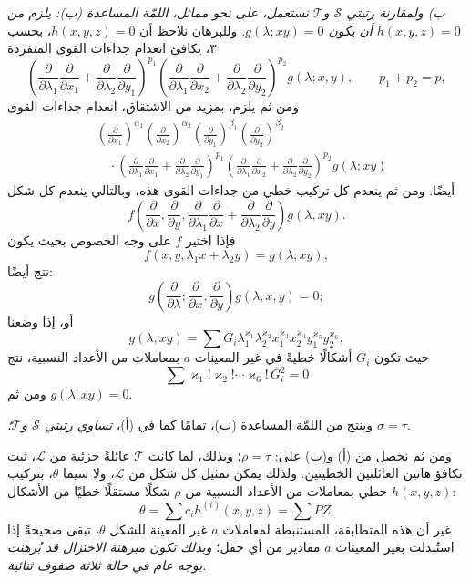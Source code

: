 \documentclass[11pt]{article}
\begin{document}
\emph{ب) ولمقارنة رتبتي $\mathcal S$ و$\mathcal T$ نستعمل، على نحو مماثل، اللمّة المساعدة (ب): يلزم من $h(x,y,z)=0$ أن يكون $g(\lambda;xy)=0$.} وللبرهان نلاحظ أن $h(x,y,z)=0$، بحسب ٣، يكافئ انعدام جداءات القوى المنفردة
\[
 \left(\frac{\partial}{\partial\lambda_1}\frac{\partial}{\partial x_1}
 +\frac{\partial}{\partial\lambda_2}\frac{\partial}{\partial y_1}\right)^{p_1}
 \left(\frac{\partial}{\partial\lambda_1}\frac{\partial}{\partial x_2}
 +\frac{\partial}{\partial\lambda_2}\frac{\partial}{\partial y_2}\right)^{p_2}g(\lambda;x,y),
 \qquad p_1+p_2=p,
\]
ومن ثم يلزم، بمزيد من الاشتقاق، انعدام جداءات القوى
\[
\begin{aligned}
&\left(\frac{\partial}{\partial x_1}\right)^{\alpha_1}
 \left(\frac{\partial}{\partial x_2}\right)^{\alpha_2}
 \left(\frac{\partial}{\partial y_1}\right)^{\beta_1}
 \left(\frac{\partial}{\partial y_2}\right)^{\beta_2} \\
&\quad\cdot
 \left(\frac{\partial}{\partial\lambda_1}\frac{\partial}{\partial x_1}
 +\frac{\partial}{\partial\lambda_2}\frac{\partial}{\partial y_1}\right)^{p_1}
 \left(\frac{\partial}{\partial\lambda_1}\frac{\partial}{\partial x_2}
 +\frac{\partial}{\partial\lambda_2}\frac{\partial}{\partial y_2}\right)^{p_2}
 g(\lambda;xy)
\end{aligned}
\]
أيضًا. ومن ثم ينعدم كل تركيب خطي من جداءات القوى هذه، وبالتالي ينعدم كل شكل
\[
  f\left(\frac{\partial}{\partial x},\frac{\partial}{\partial y},
  \frac{\partial}{\partial\lambda_1}\frac{\partial}{\partial x}
  +\frac{\partial}{\partial\lambda_2}\frac{\partial}{\partial y}\right)g(\lambda,xy).
\]
فإذا اختير $f$ على وجه الخصوص بحيث يكون
\[
  f(x,y,\lambda_1x+\lambda_2y)=g(\lambda;xy),
\]
نتج أيضًا:
\[
  g\left(\frac{\partial}{\partial\lambda};
    \frac{\partial}{\partial x},
    \frac{\partial}{\partial y}\right)g(\lambda,x,y)=0;
\]
أو، إذا وضعنا
\[
  g(\lambda,xy)=\sum G_i\lambda_1^{\varkappa_1}\lambda_2^{\varkappa_2}
  x_1^{\varkappa_3}x_2^{\varkappa_4}y_1^{\varkappa_5}y_2^{\varkappa_6},
\]
حيث تكون $G_i$ أشكالًا خطيةً في غير المعينات $a$ بمعاملات من الأعداد النسبية، نتج
\[
  \sum \varkappa_1!\varkappa_2!\cdots\varkappa_6!\,G_i^2=0
\]
ومن ثم $g(\lambda;xy)=0$.

وينتج من اللمّة المساعدة (ب)، تمامًا كما في (أ)، \emph{تساوي رتبتي $\mathcal S$ و$\mathcal T$؛ $\sigma=\tau$.}

ومن ثم نحصل من (أ) و(ب) على: $\rho=\tau$؛ وبذلك، لما كانت $\mathcal T$ عائلةً جزئية من $\mathcal L$، ثبت تكافؤ هاتين العائلتين الخطيتين. ولذلك يمكن تمثيل كل شكل من $\mathcal L$، ولا سيما $\theta$، بتركيب خطي بمعاملات من الأعداد النسبية من $\rho$ شكلًا مستقلًا خطيًا من الأشكال $h(x,y,z)$:
\[
  \theta=\sum c_i h^{(i)}(x,y,z)=\sum PZ.
\]
غير أن هذه المتطابقة، المستنبطة لمعاملات $a$ غير المعينة للشكل $\theta$، تبقى صحيحةً إذا استُبدلت بغير المعينات $a$ مقادير من أي حقل؛ \emph{وبذلك تكون مبرهنة الاختزال قد بُرهنت بوجه عام في حالة ثلاثة صفوف ثنائية.}
\end{document}
